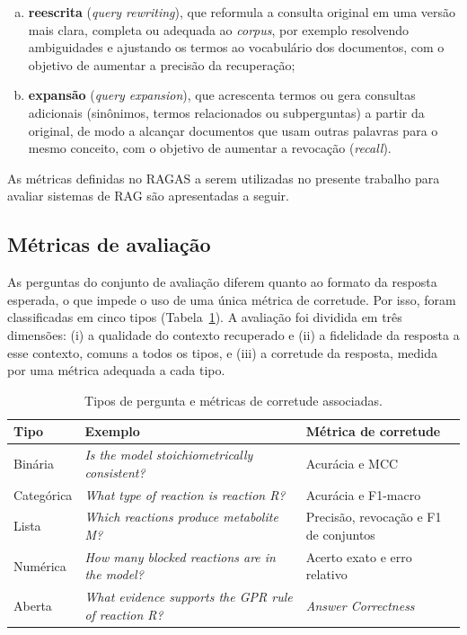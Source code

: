 \documentclass{article}
\begin{document}
\begin{enumerate}[a)]
	\item \textbf{reescrita} (\textit{query rewriting}), que reformula a consulta original em uma versão mais clara, completa ou adequada ao \textit{corpus}, por exemplo resolvendo ambiguidades e ajustando os termos ao vocabulário dos documentos, com o objetivo de aumentar a precisão da recuperação;
	\item \textbf{expansão} (\textit{query expansion}), que acrescenta termos ou gera consultas adicionais (sinônimos, termos relacionados ou subperguntas) a partir da original, de modo a alcançar documentos que usam outras palavras para o mesmo conceito, com o objetivo de aumentar a revocação (\textit{recall}).
\end{enumerate}


As métricas definidas no RAGAS a serem utilizadas no presente trabalho para avaliar sistemas de RAG são apresentadas a seguir.

\subsection{Métricas de avaliação}

As perguntas do conjunto de avaliação diferem quanto ao formato da resposta esperada, o que impede o uso de uma única métrica de corretude. Por isso, foram classificadas em cinco tipos (Tabela~\ref{tab:tipos-perguntas}). A avaliação foi dividida em três dimensões: (i) a qualidade do contexto recuperado e (ii) a fidelidade da resposta a esse contexto, comuns a todos os tipos, e (iii) a corretude da resposta, medida por uma métrica adequada a cada tipo.

\begin{table}[htbp]
	\centering
	\caption{Tipos de pergunta e métricas de corretude associadas.}
	\label{tab:tipos-perguntas}
	\begin{tabular}{p{2.6cm} p{6.2cm} p{3.6cm}}
		\hline
		\textbf{Tipo} & \textbf{Exemplo} & \textbf{Métrica de corretude} \\
		\hline
		Binária & \textit{Is the model stoichiometrically consistent?} & Acurácia e MCC \\
		Categórica & \textit{What type of reaction is reaction R?} & Acurácia e F1-macro \\
		Lista & \textit{Which reactions produce metabolite M?} & Precisão, revocação e F1 de conjuntos \\
		Numérica & \textit{How many blocked reactions are in the model?} & Acerto exato e erro relativo \\
		Aberta & \textit{What evidence supports the GPR rule of reaction R?} & \textit{Answer Correctness} \\
		\hline
	\end{tabular}
\end{table}
\end{document}
